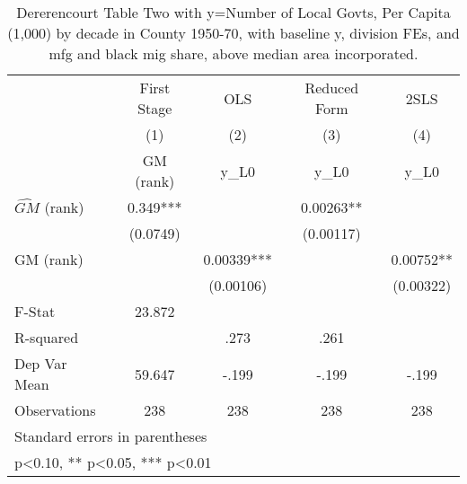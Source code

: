 \begin{table}[htbp]\centering
\def\sym#1{\ifmmode^{#1}\else\(^{#1}\)\fi}
\caption{Dererencourt Table Two with y=Number of Local Govts, Per Capita (1,000) by decade in County 1950-70, with baseline y, division FEs, and mfg and black mig share, above median area incorporated.}
\begin{tabular}{l*{4}{c}}
\toprule
                    & First Stage   &         OLS   &Reduced Form   &        2SLS   \\
                    &\multicolumn{1}{c}{(1)}&\multicolumn{1}{c}{(2)}&\multicolumn{1}{c}{(3)}&\multicolumn{1}{c}{(4)}\\
                    &\multicolumn{1}{c}{GM  (rank)}&\multicolumn{1}{c}{y\_L0}&\multicolumn{1}{c}{y\_L0}&\multicolumn{1}{c}{y\_L0}\\
\midrule
$\hat{GM}$ (rank)   &       0.349***&               &     0.00263** &               \\
                    &    (0.0749)   &               &   (0.00117)   &               \\
\addlinespace
GM  (rank)          &               &     0.00339***&               &     0.00752** \\
                    &               &   (0.00106)   &               &   (0.00322)   \\
\midrule
F-Stat              &      23.872   &               &               &               \\
R-squared           &               &        .273   &        .261   &               \\
Dep Var Mean        &      59.647   &       -.199   &       -.199   &       -.199   \\
Observations        &         238   &         238   &         238   &         238   \\
\bottomrule
\multicolumn{5}{l}{\footnotesize Standard errors in parentheses}\\
\multicolumn{5}{l}{\footnotesize * p<0.10, ** p<0.05, *** p<0.01}\\
\end{tabular}
\end{table}
